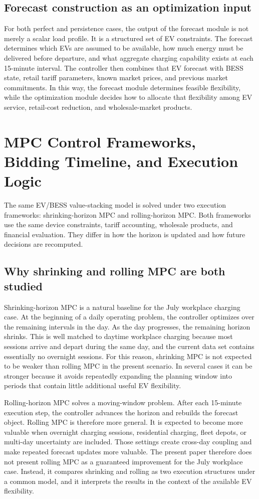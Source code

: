 \documentclass[final,5p,times]{elsarticle}
\begin{document}
\subsection{Forecast construction as an optimization input}
For both perfect and persistence cases, the output of the forecast module is not merely a scalar load profile. It is a structured set of EV constraints. The forecast determines which EVs are assumed to be available, how much energy must be delivered before departure, and what aggregate charging capability exists at each 15-minute interval. The controller then combines that EV forecast with BESS state, retail tariff parameters, known market prices, and previous market commitments. In this way, the forecast module determines feasible flexibility, while the optimization module decides how to allocate that flexibility among EV service, retail-cost reduction, and wholesale-market products.
\section{MPC Control Frameworks, Bidding Timeline, and Execution Logic}
The same EV/BESS value-stacking model is solved under two execution frameworks: shrinking-horizon MPC and rolling-horizon MPC. Both frameworks use the same device constraints, tariff accounting, wholesale products, and financial evaluation. They differ in how the horizon is updated and how future decisions are recomputed.

\subsection{Why shrinking and rolling MPC are both studied}
Shrinking-horizon MPC is a natural baseline for the July workplace charging case. At the beginning of a daily operating problem, the controller optimizes over the remaining intervals in the day. As the day progresses, the remaining horizon shrinks. This is well matched to daytime workplace charging because most sessions arrive and depart during the same day, and the current data set contains essentially no overnight sessions. For this reason, shrinking MPC is not expected to be weaker than rolling MPC in the present scenario. In several cases it can be stronger because it avoids repeatedly expanding the planning window into periods that contain little additional useful EV flexibility.

Rolling-horizon MPC solves a moving-window problem. After each 15-minute execution step, the controller advances the horizon and rebuilds the forecast object. Rolling MPC is therefore more general. It is expected to become more valuable when overnight charging sessions, residential charging, fleet depots, or multi-day uncertainty are included. Those settings create cross-day coupling and make repeated forecast updates more valuable. The present paper therefore does not present rolling MPC as a guaranteed improvement for the July workplace case. Instead, it compares shrinking and rolling as two execution structures under a common model, and it interprets the results in the context of the available EV flexibility.
\end{document}
